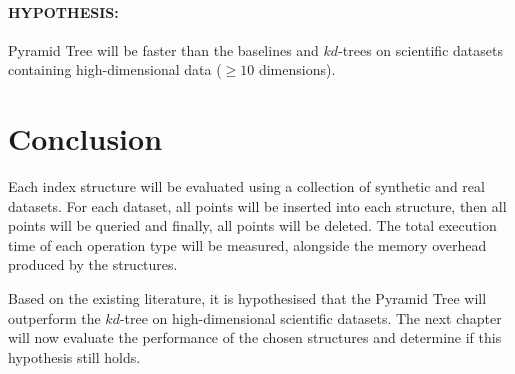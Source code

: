 \paragraph{\textbf{HYPOTHESIS:}} Pyramid Tree will be faster than the baselines and $kd$-trees on scientific datasets containing high-dimensional data ($\geq 10$ dimensions).

\section{Conclusion}

Each index structure will be evaluated using a collection of synthetic and real datasets. For each dataset, all points will be inserted into each structure, then all points will be queried and finally, all points will be deleted. The total execution time of each operation type will be measured, alongside the memory overhead produced by the structures.

Based on the existing literature, it is hypothesised that the Pyramid Tree will outperform the $kd$-tree on high-dimensional scientific datasets. The next chapter will now evaluate the performance of the chosen structures and determine if this hypothesis still holds.